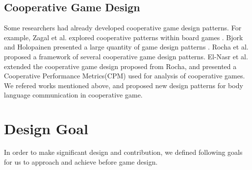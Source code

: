 \documentclass{sigchi}
\begin{document}
\subsection{Cooperative Game Design}

Some researchers had already developed cooperative game design patterns. For example, Zagal et al. explored cooperative patterns within board games \cite{CG1}. Bjork and Holopainen presented a large quantity of game design patterns \cite{CG3}. Rocha et al. \cite{CG4} proposed a framework of several cooperative game design patterns. El-Nasr et al. \cite{CPMs} extended the cooperative game design proposed from Rocha, and presented a Cooperative Performance Metrics(CPM) used for analysis of cooperative games. We refered works mentioned above, and proposed new design patterns for body language communication in cooperative game.

\section{Design Goal}
In order to make significant design and contribution, we defined following goals for us to approach and achieve before game design.
\end{document}
